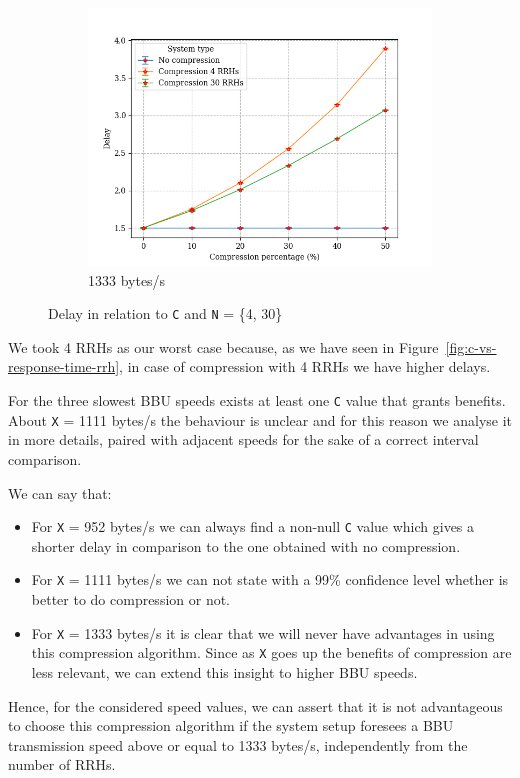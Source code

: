 \documentclass[11pt,a4paper,oneside, openright]{article}
\begin{document}
\begin{figure}[H]
\begin{subfigure}{.45\textwidth}
		\includegraphics[width=\linewidth]{images/comp-s-1333}
		\caption{1333 bytes/s}
		\label{fig:comp-s-1333}
	\end{subfigure}
	\caption{Delay in relation to \texttt{C} and \texttt{N} = \{4, 30\}}
	\label{fig:compress-s}
\end{figure}

We took 4 RRHs as our worst case because, as we have seen in Figure~\ref{fig:c-vs-response-time-rrh}, in case of compression with 4 RRHs we have higher delays.

For the three slowest BBU speeds exists at least one \texttt{C} value that grants benefits. About \texttt{X} = 1111 bytes/s the behaviour is unclear and for this reason we analyse it in more details, paired with adjacent speeds for the sake of a correct interval comparison.


We can say that:
\begin{itemize}
	\item For \texttt{X} = 952 bytes/s we can always find a non-null \texttt{C} value which gives a shorter delay in comparison to the one obtained with no compression.
	\item For \texttt{X} = 1111 bytes/s we can not state with a 99\% confidence level whether is better to do compression or not.
	\item For \texttt{X} = 1333 bytes/s it is clear that we will never have advantages in using this compression algorithm. Since as \texttt{X} goes up the benefits of compression are less relevant, we can extend this insight to higher BBU speeds. 
\end{itemize}
Hence, for the considered speed values, we can assert that it is not advantageous to choose this compression algorithm if the system setup foresees a BBU transmission speed above or equal to 1333 bytes/s, independently from the number of RRHs.
\end{document}
